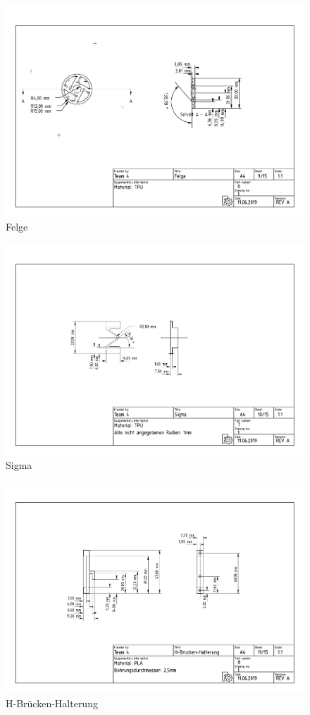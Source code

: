 \begin{figure}[ht!]
	\includegraphics[width=\textwidth]{../techzeich/6.PDF} 	
	\caption{Felge}
\end{figure}
\begin{figure}[ht!]
	\includegraphics[width=\textwidth]{../techzeich/7.PDF} 	
	\caption{Sigma}
\end{figure}
\begin{figure}[ht!]
	\includegraphics[width=\textwidth]{../techzeich/8.PDF} 	
	\caption{H-Brücken-Halterung}
\end{figure}
